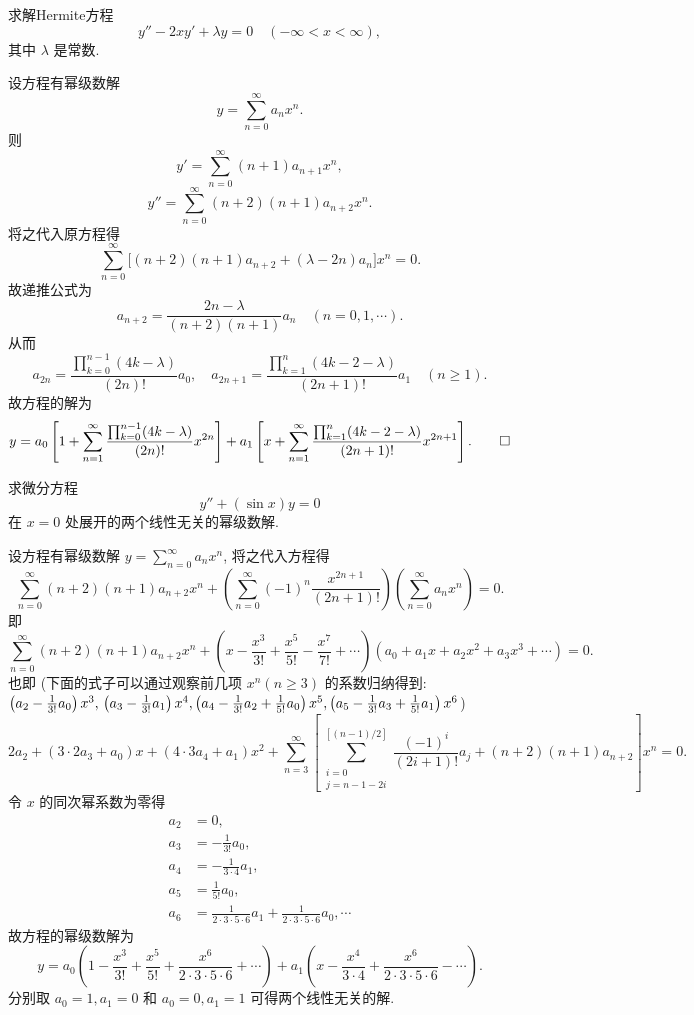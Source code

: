 \begin{exercise}
  求解Hermite方程
  \[y''-2xy'+\lambda y=0\quad (-\infty<x<\infty),\]
  其中 $\lambda$ 是常数.
\end{exercise}

\begin{solve} 
  设方程有幂级数解
  \[y=\sum_{n=0}^{\infty}a_nx^n.\]
  则
  \[y'=\sum_{n=0}^{\infty}(n+1)a_{n+1}x^n,\]
  \[y''=\sum_{n=0}^{\infty}(n+2)(n+1)a_{n+2}x^n.\]
  将之代入原方程得
  \[\sum_{n=0}^{\infty}\big[(n+2)(n+1)a_{n+2}+(\lambda-2n)a_n\big]x^n=0.\]
  故递推公式为
  \[a_{n+2}=\frac{2n-\lambda}{(n+2)(n+1)}a_n\quad (n=0,1,\cdots).\]
  从而
  \[a_{2n}=\frac{\prod_{k=0}^{n-1}(4k-\lambda)}{(2n)!}a_0,\quad
    a_{2n+1}=\frac{\prod_{k=1}^n(4k-2-\lambda)}{(2n+1)!}a_1\quad(n\geq1).\]
  故方程的解为
  \[y = a_0\left[1+\sum_{n=1}^{\infty}\frac{\prod_{k=0}^{n-1}(4k-\lambda)}{(2n)!}x^{2n}\right]
    + a_1\left[x+\sum_{n=1}^{\infty}\frac{\prod_{k=1}^n(4k-2-\lambda)}{(2n+1)!}x^{2n+1}\right].\qedhere\]
\end{solve}



\begin{exercise}
  求微分方程
  \[y''+(\sin x)y=0\]
  在 $x=0$ 处展开的两个线性无关的幂级数解.
\end{exercise}

\begin{solve}
  设方程有幂级数解 $y=\sum_{n=0}^{\infty}a_nx^n$, 将之代入方程得
  \[\sum_{n=0}^{\infty}(n+2)(n+1)a_{n+2}x^n
    + \left(\sum_{n=0}^{\infty}(-1)^n\frac{x^{2n+1}}{(2n+1)!}\right)
    \left(\sum_{n=0}^{\infty}a_nx^n\right)=0.\]
  即
  \[\sum_{n=0}^{\infty}(n+2)(n+1)a_{n+2}x^n
    + \left(x-\frac{x^3}{3!}+\frac{x^5}{5!}-\frac{x^7}{7!}
    + \cdots\right)\left(a_0+a_1x+a_2x^2+a_3x^3+\cdots\right)=0.\]
  也即 (下面的式子可以通过观察前几项 $x^n(n\geq3)$ 的系数归纳得到: 
  $\left(a_2-\frac{1}{3!}a_0\right)x^3,\\\left(a_3-\frac{1}{3!}a_1\right)x^4,\left(a_4-\frac{1}{3!}a_2+\frac{1}{5!}a_0\right)x^5,\left(a_5-\frac{1}{3!}a_3+\frac{1}{5!}a_1\right)x^6$)
  \[2a_2+(3\cdot2a_3+a_0)x+(4\cdot3a_4+a_1)x^2
    + \sum_{n=3}^{\infty}\left[\sum_{\substack{i=0\\j=n-1-2i}}^{[(n-1)/2]}\frac{(-1)^i}{(2i+1)!}a_j+(n+2)(n+1)a_{n+2}\right]x^n=0.\]
  令 $x$ 的同次幂系数为零得
  \begin{align*}
    a_2 & = 0, \\
    a_3 & = -\frac{1}{3!}a_0, \\
    a_4 & = -\frac{1}{3\cdot4}a_1, \\
    a_5 & = \frac{1}{5!}a_0, \\
    a_6 & = \frac{1}{2\cdot 3\cdot 5\cdot 6}a_1+\frac{1}{2\cdot 3\cdot 5\cdot 6}a_0,\cdots
  \end{align*}
  故方程的幂级数解为
  \[y=a_0\left(1-\frac{x^3}{3!}+\frac{x^5}{5!}+\frac{x^6}{2\cdot3\cdot5\cdot6}
    + \cdots\right)+a_1\left(x-\frac{x^4}{3\cdot4}+\frac{x^6}{2\cdot3\cdot5\cdot6}-\cdots\right).\]
  分别取 $a_0=1,a_1=0$ 和 $a_0=0,a_1=1$ 可得两个线性无关的解.
\end{solve}



